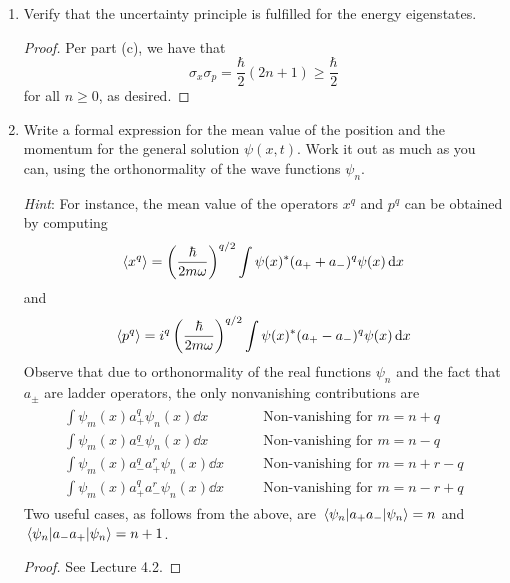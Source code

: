 \documentclass[../psets.tex]{subfiles}
\begin{document}
\begin{enumerate}
\begin{enumerate}
\begin{proof}
\begin{align*}
            \end{align*}
            we have that
            \begin{align*}
                \sigma_x^2\cdot\sigma_p^2 &= \hbar^2\left( n+\frac{1}{2} \right)^2\\
                \Aboxed{\sigma_x\sigma_p &= \frac{\hbar}{2}(2n+1)}
            \end{align*}
        \end{proof}
        \item Verify that the uncertainty principle is fulfilled for the energy eigenstates.
        \begin{proof}
            Per part (c), we have that
            \begin{equation*}
                \sigma_x\sigma_p = \frac{\hbar}{2}(2n+1)
                \geq \frac{\hbar}{2}
            \end{equation*}
            for all $n\geq 0$, as desired.
        \end{proof}
        \item Write a formal expression for the mean value of the position and the momentum for the general solution $\psi(x,t)$. Work it out as much as you can, using the orthonormality of the wave functions $\psi_n$.\par
        \emph{Hint}: For instance, the mean value of the operators $x^q$ and $p^q$ can be obtained by computing
        \begin{equation}
            \langle{x^q}\rangle = \left( \frac{\hbar}{2m\omega} \right)^{q/2}\int\psi(x)^*(a_++a_-)^q\psi(x)\dd{x}
        \end{equation}
        and
        \begin{equation}
            \langle{p^q}\rangle = i^q\left( \frac{\hbar}{2m\omega} \right)^{q/2}\int\psi(x)^*(a_+-a_-)^q\psi(x)\dd{x}
        \end{equation}
        Observe that due to orthonormality of the real functions $\psi_n$ and the fact that $a_\pm$ are ladder operators, the only nonvanishing contributions are
        \begin{align}
            \begin{split}
                \int\psi_m(x)a_+^q\psi_n(x)\dd{x} &\qquad \text{Non-vanishing for }m=n+q\\
                \int\psi_m(x)a_-^q\psi_n(x)\dd{x} &\qquad \text{Non-vanishing for }m=n-q\\
                \int\psi_m(x)a_-^qa_+^r\psi_n(x)\dd{x} &\qquad \text{Non-vanishing for }m=n+r-q\\
                \int\psi_m(x)a_+^qa_-^r\psi_n(x)\dd{x} &\qquad \text{Non-vanishing for }m=n-r+q
            \end{split}
        \end{align}
        Two useful cases, as follows from the above, are $\ev{a_+a_-}{\psi_n}=n$ and $\ev{a_-a_+}{\psi_n}=n+1$.
        \begin{proof}
            See Lecture 4.2.
        \end{proof}
    \end{enumerate}
\end{enumerate}
\end{document}
